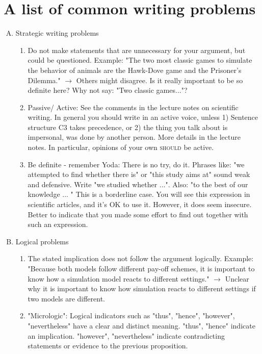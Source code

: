 \documentclass{tufte-book}
\begin{document}
\section{A list of common writing problems}


\begin{enumerate}[(A)]


\item Strategic writing problems
\begin{enumerate}
	\item Do not make statements that are unnecessary for your argument, but could be questioned. 
	Example: "The two most classic games to simulate the behavior of animals are the Hawk-Dove game and the Prisoner's Dilemma." $\rightarrow$ Others might disagree. Is it really important to be so definite here? Why not say: "Two classic games..."?
	\item Passive/ Active: See the comments in the lecture notes on scientific writing. In general you should write in an active voice, unless  1) Sentence structure C3 takes precedence, or 2) the thing you talk about is impersonal, was done by another person. More details in the lecture notes. In particular, opinions of your own \textsc{should} be active.
	\item Be definite - remember Yoda: There is no try, do it. Phrases like: "we attempted to find whether there is" or "this study aims at" sound weak and defensive. Write "we studied whether ...". Also: "to the best of our knowledge ... " This is a borderline case. You will see this expression in scientific articles, and it's OK to use it. However, it does seem insecure. Better to indicate that you made some effort to find out together with such an expression. 	
	
 

\end{enumerate}

\item Logical problems
\begin{enumerate}
	\item The stated implication does not follow the argument logically. Example: "Because both models follow different pay-off schemes, it is important to know how a simulation model reacts to different settings." $\rightarrow$ Unclear why it is important to know how simulation reacts to different settings if two models are different.
	\item "Micrologic": Logical indicators such as "thus", "hence", "however", "nevertheless" have a clear and distinct meaning. "thus", "hence" indicate an implication. "however", "nevertheless" indicate contradicting statements or evidence to the previous proposition.
\end{enumerate}



\end{enumerate}
\end{document}
